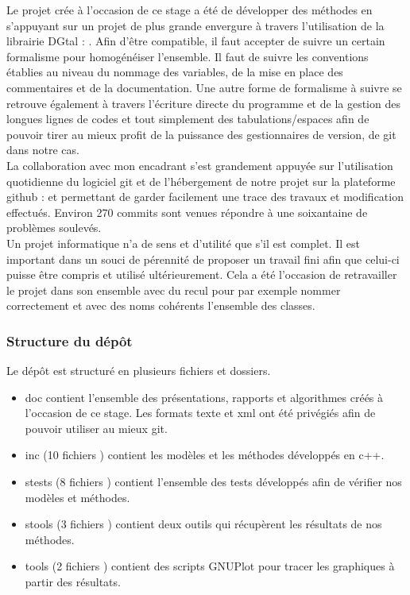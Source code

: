 Le projet crée à l'occasion de ce stage a été de développer des méthodes en s'appuyant sur un projet de plus grande envergure à travers l'utilisation de la librairie DGtal : \cite{DGtal}. Afin d'être compatible, il faut accepter de suivre un certain formalisme pour homogénéiser l'ensemble. Il faut de suivre les conventions établies au niveau du nommage des variables, de la mise en place des commentaires et de la documentation. Une autre forme de formalisme à suivre se retrouve également à travers l'écriture directe du programme et de la gestion des longues lignes de codes et tout simplement des tabulations/espaces afin de pouvoir tirer au mieux profit de la puissance des gestionnaires de version, de git dans notre cas.\\

La collaboration avec mon encadrant s'est grandement appuyée sur l'utilisation quotidienne du logiciel git et de l’hébergement de notre projet sur la plateforme github : \cite{github-tristan} et \cite{github-thomas} permettant de garder facilement une trace des travaux et modification effectués. Environ 270 commits sont venues répondre à une soixantaine de problèmes soulevés.\\

Un projet informatique n'a de sens et d'utilité que s'il est complet. Il est important dans un souci de pérennité de proposer un travail fini afin que celui-ci puisse être compris et utilisé ultérieurement. Cela a été l’occasion de retravailler le projet dans son ensemble avec du recul pour par exemple nommer correctement et avec des noms cohérents l'ensemble des classes.

\subsubsection{Structure du dépôt}


Le dépôt est structuré en plusieurs fichiers et dossiers.

\begin{itemize}
  \item doc contient l'ensemble des présentations, rapports et algorithmes créés à l'occasion de ce stage. Les formats texte et xml ont été privégiés afin de pouvoir utiliser au mieux git.
  \item inc (10 fichiers ) contient les modèles et les méthodes développés en c++. 
  \item stests (8 fichiers ) contient l'ensemble des tests développés afin de vérifier nos modèles et méthodes.
  \item stools (3 fichiers ) contient deux outils qui récupèrent les résultats de nos méthodes.
  \item tools (2 fichiers ) contient des scripts GNUPlot pour tracer les graphiques à partir des résultats.
\end{itemize}

